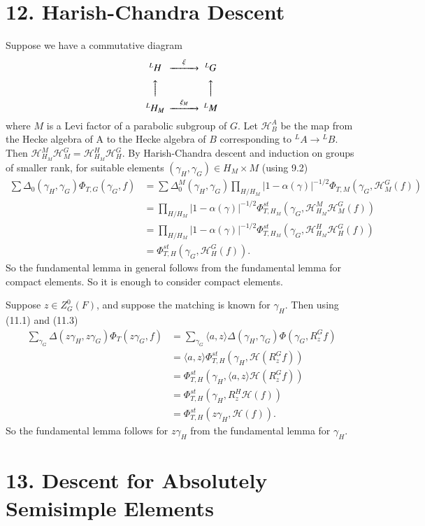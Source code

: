 \documentclass[11pt]{amsart}
\theoremstyle{plain}
\theoremstyle{definition}
\def\hgam{\gamma_H}
\def\ggam{\gamma_G}
\begin{document}
\section{12.  Harish-Chandra Descent}

Suppose we have a commutative diagram
$$
\CD
{}^LH @>\xi>> {}^LG\\
@AAA  @AAA\\
{}^L{H_M} @>{\xi_M}>> {}^LM
\endCD
$$
where $M$ is a Levi factor of a parabolic subgroup 
of $G$.  Let $\mathcal{ H}_B^A$ be the map from the Hecke algebra of A to the Hecke algebra
of $B$ corresponding to ${}^LA\to {}^LB$.  Then
$\mathcal{ H}_{H_M}^M\mathcal{ H}_{M}^G=\mathcal{ H}_{H_M}^H\mathcal{ H}_H^G$. 
By Harish-Chandra descent and induction on groups of
smaller rank, for suitable elements
$(\hgam,\ggam)\in H_M\times M$ (using 9.2)
$$
\begin{array}{lll}
\sum \Delta_0(\hgam,\ggam)\Phi_{T,G}(\ggam,f)
&=\sum\Delta_0^M(\hgam,\ggam)\prod_{H/H_M}|1-\alpha(\gamma)|^{-1/2}\Phi_{T,M}
       (\ggam,\mathcal{ H}_M^G(f))\\
&=\prod_{H/H_M}|1-\alpha(\gamma)|^{-1/2}\Phi_{T,H_M}^{st}(\ggam,\mathcal{ H}_{H_M}^M\mathcal{ H}_M^G(f))\\
&=\prod_{H/H_M}|1-\alpha(\gamma)|^{-1/2}\Phi_{T,H_M}^{st}(\ggam,\mathcal{ H}_{H_M}^H\mathcal{ H}_H^G(f))\\
&=\Phi_{T,H}^{st}(\ggam,\mathcal{ H}_H^G(f)).
\end{array}
$$
So the fundamental lemma in general follows from the fundamental lemma for
compact elements.  So it is enough to consider compact elements.

Suppose $z\in Z_G^0(F)$,
and suppose the matching is known for $\hgam$.
Then using (11.1) and (11.3)
$$
\begin{array}{lll}
\sum_{\ggam}\Delta(z\hgam,z\ggam)\Phi_T(z\ggam,f)
&=\sum_{\ggam}\langle a,z\rangle
\Delta(\hgam,\ggam)\Phi(\ggam,R_z^Gf)\\
&=\langle a,z\rangle\Phi_{T,H}^{st}(\hgam,\mathcal{ H}(R_z^Gf)) \\
&=\Phi_{T,H}^{st}(\hgam,\langle a,z\rangle\mathcal{ H}(R_z^Gf))\\
&=\Phi_{T,H}^{st}(\hgam,R_z^H\mathcal{ H}(f))\\
&=\Phi_{T,H}^{st}(z\hgam,\mathcal{ H}(f)).
\end{array}
$$
So the fundamental lemma follows
for $z\hgam$ from the 
fundamental lemma for $\hgam$. 

\vskip3pc
\section{13. Descent for Absolutely Semisimple Elements}
\end{document}
